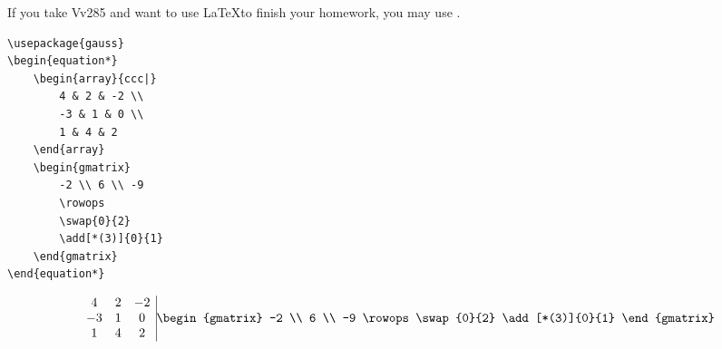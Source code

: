 \begin{frame}[fragile]
	If you take Vv285 and want to use \LaTeX to finish your homework, you may use .
	\begin{example}
		\begin{minipage}{0.5\linewidth}
			\begin{verbatim}
\usepackage{gauss}
\begin{equation*}
    \begin{array}{ccc|}
        4 & 2 & -2 \\
        -3 & 1 & 0 \\
        1 & 4 & 2
    \end{array}
    \begin{gmatrix}
        -2 \\ 6 \\ -9
        \rowops
        \swap{0}{2}
        \add[*(3)]{0}{1}
    \end{gmatrix}
\end{equation*}
			\end{verbatim}
		\end{minipage}
		\begin{minipage}{0.4\linewidth}
			\begin{equation*}
    \begin{array}{ccc|}
        4 & 2 & -2 \\
        -3 & 1 & 0 \\
        1 & 4 & 2
    \end{array}
    \begin{gmatrix}
        -2 \\ 6 \\ -9
        \rowops
        \swap{0}{2}
        \add[*(3)]{0}{1}
    \end{gmatrix}
\end{equation*}
		\end{minipage}
	\end{example}
\end{frame}

